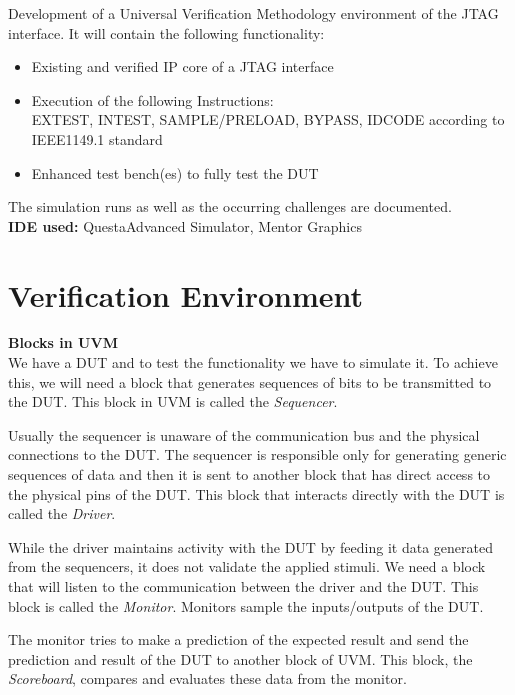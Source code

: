 \documentclass[a4paper,11pt]{article}
\begin{document}
Development of a Universal Verification Methodology environment of the JTAG interface. It will contain the following functionality:

\begin{itemize}
\item Existing and verified IP core of a JTAG interface
\item Execution of the following Instructions: \\EXTEST, INTEST, SAMPLE/PRELOAD, BYPASS, IDCODE according to IEEE1149.1 standard
\item Enhanced test bench(es) to fully test the DUT
\end{itemize}

The simulation runs as well as the occurring challenges are documented.
\\ \textbf{IDE used:} Questa\textregistered Advanced Simulator, Mentor Graphics

\newpage
\pagebreak
\section{Verification Environment}

\textbf{Blocks in UVM}
\ \\
We have a DUT and to test the functionality we have to simulate it. To achieve this, we will need a block that generates sequences of bits to be transmitted to the DUT. This block in UVM is called the \textit{Sequencer}. 

Usually the sequencer is unaware of the communication bus and the physical connections to the DUT. The sequencer is responsible only for generating generic sequences of data and then it is sent to another block that has direct access to the physical pins of the DUT. This block that interacts directly with the DUT is called the \textit{Driver}.

While the driver maintains activity with the DUT by feeding it data generated from the sequencers, it does not validate the applied stimuli. We need a block that will listen to the communication between the driver and the DUT. This block is called the \textit{Monitor}. Monitors sample the inputs/outputs of the DUT.

The monitor tries to make a prediction of the expected result and send the prediction and result of the DUT to another block of UVM. This block, the \textit{Scoreboard}, compares and evaluates these data from the monitor.
\end{document}
